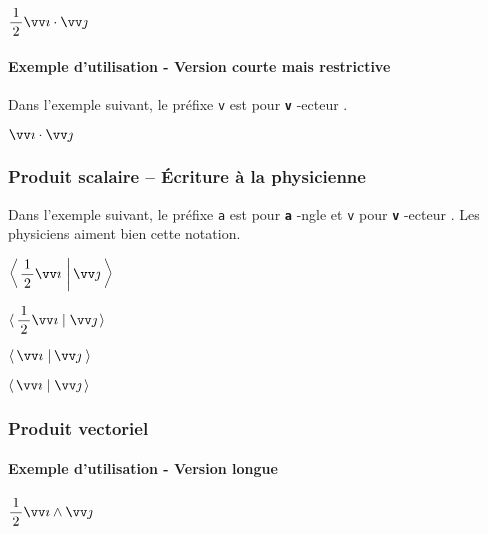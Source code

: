 \documentclass[12pt,a4paper]{article}
\theoremstyle{definition}
\newcommand\whyprefix[2]{%
	\textbf{\prefix{#1}}-#2%
}
\newcommand\prefix[1]{%
	\texttt{#1}%
}
\begin{document}
\begin{latexex}
$\dotprod{\dfrac{1}{2} \vect{i}}%
         {\vect{j}}$
\end{latexex}




\paragraph{Exemple d'utilisation - Version courte mais restrictive}

Dans l'exemple suivant, le préfixe \prefix{v} est pour \whyprefix{v}{ecteur}.

\begin{latexex}
$\vdotprod{i}{j}$
\end{latexex}




\subsubsection{Produit scalaire -- Écriture \og à la physicienne \fg}

Dans l'exemple suivant, le préfixe \prefix{a} est pour \whyprefix{a}{ngle} et  \prefix{v} pour \whyprefix{v}{ecteur}.
Les physiciens aiment bien cette notation.

\begin{latexex}

$\displaystyle
 \adotprod{\frac{1}{2} \vect{i}}%
          {\vect{j}}$

$\displaystyle
 \adotprod*{\frac{1}{2} \vect{i}}%
           {\vect{j}}$
 
$\vadotprod{i}{j}$

$\vadotprod*{i}{j}$
\end{latexex}




\subsubsection{Produit vectoriel}

\paragraph{Exemple d'utilisation - Version longue}

\begin{latexex}
$\crossprod{\dfrac{1}{2} \vect{i}}%
           {\vect{j}}$ 
\end{latexex}
\end{document}
